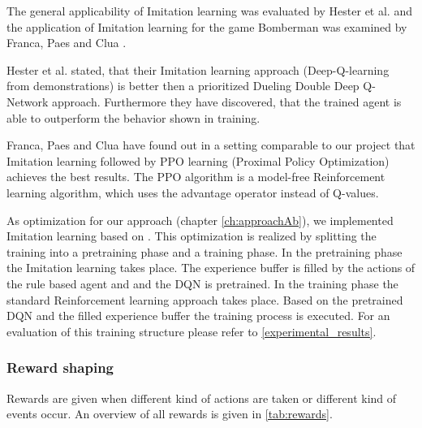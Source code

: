The general applicability of Imitation learning was evaluated by Hester et al. \cite{hester2017deep} and the application of Imitation learning for the game Bomberman was examined by Franca, Paes and Clua \cite{Franca2019}.

Hester et al. \cite{hester2017deep} stated, that their Imitation learning approach (Deep-Q-learning from demonstrations) is better then a prioritized Dueling Double Deep Q-Network approach. Furthermore they have discovered, that the trained agent is able to outperform the behavior shown in training.

Franca, Paes and Clua \cite{Franca2019} have found out in a setting comparable to our project that Imitation learning followed by PPO learning (Proximal Policy Optimization) achieves the best results. The PPO algorithm is a model-free Reinforcement learning algorithm, which uses the advantage operator instead of Q-values.

As optimization for our approach (chapter \ref{ch:approachAb}), we implemented Imitation learning based on \cite{hester2017deep}. This optimization is realized by splitting the training into a pretraining phase and a training phase. In the pretraining phase the Imitation learning takes place. The experience buffer is filled by the actions of the rule based agent and and the DQN is pretrained.
In the training phase the standard Reinforcement learning approach takes place. Based on the pretrained DQN and the filled experience buffer the training process is executed.
For an evaluation of this training structure please refer to \ref{experimental_results}.

\subsubsection{Reward shaping}
\label{ch:approachBd}

Rewards are given when different kind of actions are taken or different kind of events occur. An overview of all rewards is given in \autoref{tab:rewards}.

